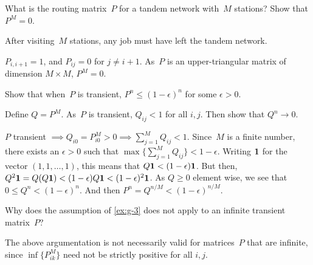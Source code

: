 \documentclass[stochastic-or.tex]{subfiles}
\begin{document}
\begin{exercise}
What is the  routing matrix~$P$ for a tandem network with~$M$ stations? Show that $P^M = 0$.
\begin{hint}
After visiting~$M$ stations, any job must have left the tandem network.
\end{hint}
\begin{solution}
$P_{i, i+1} = 1$, and $P_{i j} = 0$ for $j\neq i+1$. As~$P$ is an upper-triangular matrix of dimension $M\times M$, $P^M =0$.
\end{solution}
\end{exercise}



\begin{exercise}\label{ex:g-3}
Show that when~$P$ is transient, $P^n \leq (1-\epsilon)^n$ for some $\epsilon > 0$.
\begin{hint}
  Define $Q= P^M$. As~$P$ is transient, $Q_{ij} < 1$ for all $i, j$. Then show that $Q^n \to 0$.
\end{hint}
\begin{solution}
  $P$ transient $\implies Q_{i0} = P_{i0}^M > 0 \implies \sum_{j=1}^M Q_{ij} < 1$.
  Since~$M$ is a finite number, there exists an $\epsilon>0$ such that $\max\{\sum_{j=1}^M Q_{ij}\} < 1-\epsilon$.
  Writing $\bf 1$ for the vector $(1,1,\ldots, 1)$, this  means that $Q{\bf 1} < (1-\epsilon) {\bf 1}$.
  But then, $ Q^{2} {\bf 1} = Q(Q{\bf 1}) < (1-\epsilon) Q{\bf 1} < (1-\epsilon)^2 {\bf 1}$.
As $Q\geq 0$ element wise, we see that $0\leq Q^n < (1-\epsilon)^n$. And then $P^n = Q^{n/M} < (1-\epsilon)^{n/M}$.
\end{solution}
\end{exercise}




\begin{exercise}
  Why does the assumption of \cref{ex:g-3} does not apply to an infinite transient matrix~$P$?
\begin{solution}
  The above argumentation is not necessarily valid for matrices~$P$ that are infinite, since $\inf\{P^{M}_{ik}\}$ need not be strictly positive for all $i, j$.
\end{solution}
\end{exercise}



\end{document}
